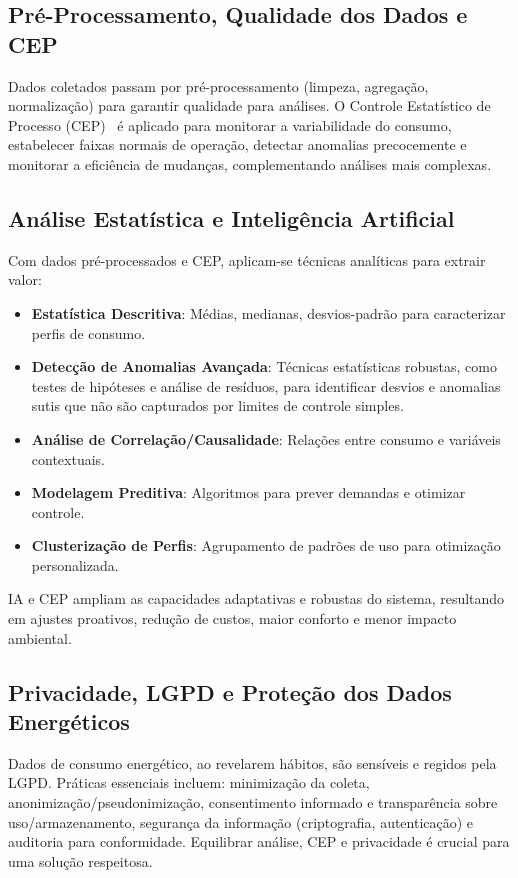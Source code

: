 \subsection{Pré-Processamento, Qualidade dos Dados e CEP}
Dados coletados passam por pré-processamento (limpeza, agregação, normalização) para garantir qualidade para análises. O Controle Estatístico de Processo (CEP)~\cite{Braga2013SPCBuildingEnergy} é aplicado para monitorar a variabilidade do consumo, estabelecer faixas normais de operação, detectar anomalias precocemente e monitorar a eficiência de mudanças, complementando análises mais complexas.
\subsection{Análise Estatística e Inteligência Artificial}
Com dados pré-processados e CEP, aplicam-se técnicas analíticas para extrair valor:
\begin{itemize}
    \item \textbf{Estatística Descritiva}: Médias, medianas, desvios-padrão para caracterizar perfis de consumo.
    \item \textbf{Detecção de Anomalias Avançada}: Técnicas estatísticas robustas, como testes de hipóteses e análise de resíduos, para identificar desvios e anomalias sutis que não são capturados por limites de controle simples.
    \item \textbf{Análise de Correlação/Causalidade}: Relações entre consumo e variáveis contextuais.
    \item \textbf{Modelagem Preditiva}: Algoritmos para prever demandas e otimizar controle.
    \item \textbf{Clusterização de Perfis}: Agrupamento de padrões de uso para otimização personalizada.
\end{itemize}
IA e CEP ampliam as capacidades adaptativas e robustas do sistema, resultando em ajustes proativos, redução de custos, maior conforto e menor impacto ambiental.

\subsection{Privacidade, LGPD e Proteção dos Dados Energéticos}
Dados de consumo energético, ao revelarem hábitos, são sensíveis e regidos pela LGPD. Práticas essenciais incluem: minimização da coleta, anonimização/pseudonimização, consentimento informado e transparência sobre uso/armazenamento, segurança da informação (criptografia, autenticação) e auditoria para conformidade. Equilibrar análise, CEP e privacidade é crucial para uma solução respeitosa.

